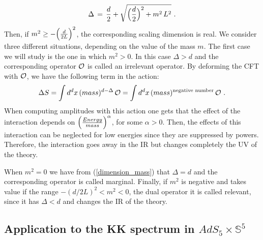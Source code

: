 \documentclass[12pt,notitlepage]{article}
\newcommand{\beq}{\begin{equation}}
\newcommand{\eeq}{\end{equation}}
\begin{document}
\beq
\Delta\,=\,{d\over 2}+\sqrt{\Big({d\over 2}\Big)^2+m^2\,L^2}\,\,.
\label{dimension_mass}
\eeq
Then, if $m^2\ge -\Big({d\over 2L}\Big)^2$, the corresponding scaling dimension is real.
We consider three different situations, depending on the value of the mass $m$.  The first case we will study is  the one in which $m^2>0$.  In this case $\Delta>d$ and the corresponding operator ${\cal O}$ is called an irrelevant operator. By deforming the CFT with ${\cal O}$, we have the following term in the action:
\beq
\Delta S= \int d^dx\, (mass)^{d-\Delta}\,{\cal O}=
\int d^dx\, (mass)^{{\rm negative\,\,number}}\,{\cal O}\,\,. 
\eeq
When computing amplitudes with this action one gets that the effect of the interaction depends on $\Big({Energy\over mass}\Big)^{\alpha}$, for some $\alpha>0$. Then, the effects of this interaction can be neglected for low energies since they are suppressed by powers. Therefore, the interaction goes away in the IR but changes completely the UV of the theory.



When $m^2=0$ we have from (\ref{dimension_mass}) that  $\Delta=d$ and the corresponding  operator is called marginal. Finally, if  $m^2$ is negative and takes value if the range $-(d/ 2L)^2<m^2<0$, the dual operator it is called relevant, since it has $\Delta<d$ and changes the IR of the theory. 

\subsection{Application to the KK spectrum in $AdS_5\times {\mathbb S}^5$}
\end{document}
